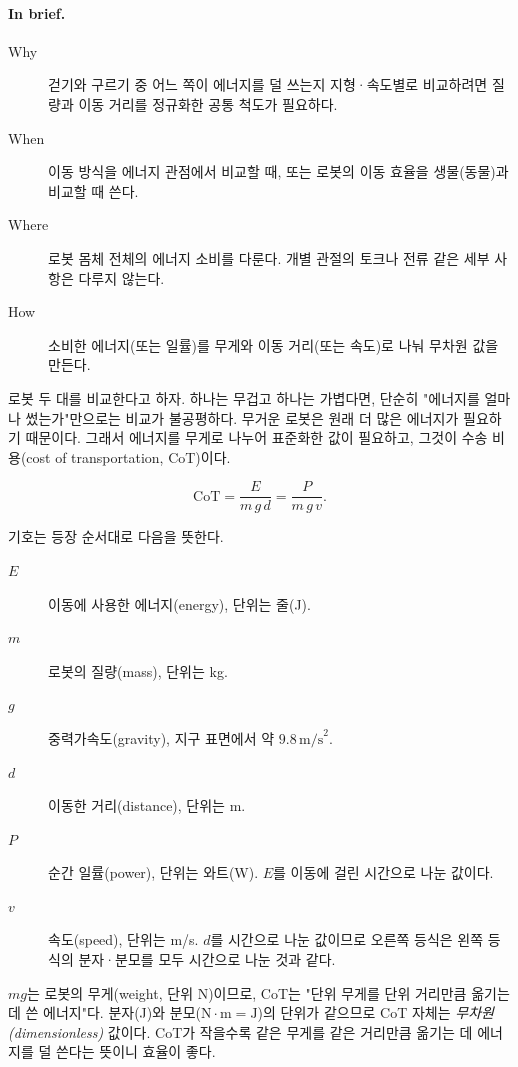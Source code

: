 \paragraph{In brief.}
\begin{description}
  \item[Why] 걷기와 구르기 중 어느 쪽이 에너지를 덜 쓰는지 지형·속도별로 비교하려면
        질량과 이동 거리를 정규화한 공통 척도가 필요하다.
  \item[When] 이동 방식을 에너지 관점에서 비교할 때, 또는 로봇의 이동 효율을
        생물(동물)과 비교할 때 쓴다.
  \item[Where] 로봇 몸체 전체의 에너지 소비를 다룬다. 개별 관절의 토크나 전류
        같은 세부 사항은 다루지 않는다.
  \item[How] 소비한 에너지(또는 일률)를 무게와 이동 거리(또는 속도)로 나눠
        무차원 값을 만든다.
\end{description}

로봇 두 대를 비교한다고 하자. 하나는 무겁고 하나는 가볍다면, 단순히 "에너지를
얼마나 썼는가"만으로는 비교가 불공평하다. 무거운 로봇은 원래 더 많은 에너지가
필요하기 때문이다. 그래서 에너지를 무게로 나누어 표준화한 값이 필요하고, 그것이
수송 비용(cost of transportation, CoT)이다.

\begin{equation}
\label{eq:lec02-cot}
\mathrm{CoT} = \frac{E}{m\,g\,d} = \frac{P}{m\,g\,v}.
\end{equation}

기호는 등장 순서대로 다음을 뜻한다.

\begin{description}
  \item[$E$] 이동에 사용한 에너지(energy), 단위는 줄(J).
  \item[$m$] 로봇의 질량(mass), 단위는 kg.
  \item[$g$] 중력가속도(gravity), 지구 표면에서 약 $9.8\,\text{m/s}^2$.
  \item[$d$] 이동한 거리(distance), 단위는 m.
  \item[$P$] 순간 일률(power), 단위는 와트(W). $E$를 이동에 걸린 시간으로 나눈 값이다.
  \item[$v$] 속도(speed), 단위는 m/s. $d$를 시간으로 나눈 값이므로 오른쪽 등식은
        왼쪽 등식의 분자·분모를 모두 시간으로 나눈 것과 같다.
\end{description}

$m g$는 로봇의 무게(weight, 단위 N)이므로, CoT는 "단위 무게를 단위 거리만큼
옮기는 데 쓴 에너지"다. 분자(J)와 분모($\text{N}\cdot\text{m} = \text{J}$)의
단위가 같으므로 CoT 자체는 \emph{무차원(dimensionless)} 값이다. CoT가 작을수록
같은 무게를 같은 거리만큼 옮기는 데 에너지를 덜 쓴다는 뜻이니 효율이 좋다.

